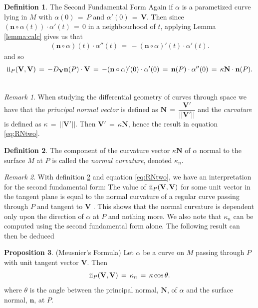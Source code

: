 \documentclass{UKZNcomp}
\newcommand{\vect}[1]{\mathbf{#1}} %
\newcommand{\RN}[1]{%
  \textup{\uppercase\expandafter{\romannumeral#1}}%
}
\theoremstyle{definition}
\newtheorem{definition}{Definition}[section]
\newtheorem{prop}[definition]{Proposition}
\theoremstyle{remark}
\newtheorem*{remark}{Remark}
\begin{document}
\begin{definition}{The Second Fundamental Form}
Again if $\alpha$ is a parametized curve lying in $M$ with $\alpha(0)\,=\,P$ and $\alpha'(0)\,=\,\vect V$. Then since $(\vect n\circ\alpha(t))\cdot\alpha'(t)\,=\,0$ in a neighbourhood of $t$, applying Lemma \ref{lemma:calc} gives us that
\begin{align*}
(\vect n\circ\alpha)(t)\cdot\alpha''(t)\,=\,-(\vect n\circ\alpha)'(t)\cdot\alpha'(t).
\end{align*}
and so
\begin{align}
\RN{2}_P(\vect V, \vect V)\,=\,-D_{\vect V}\vect n(P)\cdot\vect V\,=\,-(\vect n\circ\alpha)'(0)\cdot\alpha'(0)\,=\,\vect n(P)\cdot\alpha''(0)\,=\,\kappa\vect N\cdot\vect n(P).\label{eq:RNtwo}\\\nonumber
\end{align}

\begin{remark}
When studying the differential geometry of curves through space we have that the \textit{principal normal vector} is defined as $\vect N\,=\,\dfrac{\vect V'}{\lvert \lvert \vect V' \rvert\rvert}$ and the \textit{curvature} is defined as $\kappa\,=\,\lvert\lvert\vect V'\rvert\rvert$. Then $\vect V'\,=\,\kappa\vect N$, hence the result in equation \ref{eq:RNtwo}.
\end{remark}
\end{definition}

\begin{definition}\label{def:normalcurv}
The component of the curvature vector $\kappa\vect N$ of $\alpha$ normal to the surface $M$ at $P$ is called the \textit{normal curvature}, denoted $\kappa_n$.
\end{definition}

\begin{remark}
With definition \ref{def:normalcurv} and equation \ref{eq:RNtwo}, we have an interpretation for the second fundamental form: The value of $\RN{2}_P(\vect V, \vect V)$ for some unit vector in the tangent plane is equal to the normal curvature of a regular curve passing through $P$ and tangent to $\vect V$ \cite{DC1976}. This shows that the normal curvature is dependent only upon the direction of $\alpha$ at $P$ and nothing more. We also note that $\kappa_n$ can be computed using the second fundamental form alone. The following result can then be deduced
\end{remark}
\begin{prop}{(Meusnier's Formula)}
Let $\alpha$ be a curve on $M$ passing through $P$ with unit tangent vector $\vect V$. Then
\begin{align*}
\RN{2}_P(\vect V, \vect V)\,=\,\kappa_n\,=\,\kappa\cos\theta.
\end{align*}
where $\theta$ is the angle between the principal normal, $\vect N$, of $\alpha$ and the surface normal, $\vect n$, at $P$.
\end{prop}
\end{document}
